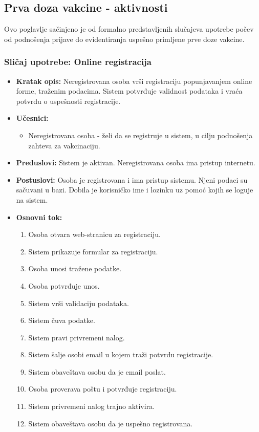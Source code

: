 \documentclass[titlepage]{article}
\begin{document}

\subsection{Prva doza vakcine - aktivnosti}
Ovo poglavlje sačinjeno je od formalno predstavljenih slučajeva upotrebe počev od podnošenja prijave do evidentiranja uspešno primljene prve doze vakcine.

\subsubsection{Sličaj upotrebe: Online registracija}
\begin{itemize}
    \item \textbf{Kratak opis:} Neregistrovana osoba vrši registraciju popunjavanjem online forme, traženim podacima. Sistem potvrđuje validnost podataka i vraća potvrdu o uspešnosti registracije.
    \item \textbf{Učesnici:}
        \begin{itemize}
            \item Neregistrovana osoba - želi da se registruje u sistem, u cilju podnošenja zahteva za vakcinaciju.
        \end{itemize}
    \item \textbf{Preduslovi:} Sistem je aktivan. Neregistrovana osoba ima pristup internetu.
    \item \textbf{Postuslovi:} Osoba je registrovana i ima pristup sistemu. Njeni podaci su sačuvani u bazi. Dobila je korisničko ime i lozinku uz pomoć kojih se loguje na sistem.
    \item \textbf{Osnovni tok:}
        \begin{enumerate}
            \item Osoba otvara web-stranicu za registraciju.
	    \item Sistem prikazuje formular za registraciju.
	    \item Osoba unosi tražene podatke.
	    \item Osoba potvrđuje unos.
	    \item Sistem vrši validaciju podataka.
	    \item Sistem čuva podatke.
	    \item Sistem pravi privremeni nalog.
	    \item Sistem šalje osobi email u kojem traži potvrdu registracije.
	    \item Sistem obaveštava osobu da je email poslat.
	    \item Osoba proverava poštu i potvrđuje registraciju.
	    \item Sistem privremeni nalog trajno aktivira.
            \item Sistem obaveštava osobu da je uspešno registrovana.
	\end{enumerate}
     

\end{itemize}
\end{document}
